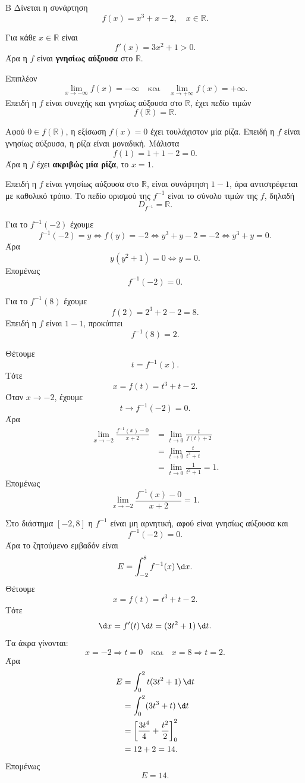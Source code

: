 \begin{thema}{Β}
Δίνεται η συνάρτηση
\[
f(x)=x^3+x-2,\quad x\in\mathbb{R}.
\]
\begin{erwthma}
\item Για κάθε $x\in\mathbb{R}$ είναι
\[
f'(x)=3x^2+1>0.
\]
Άρα η $f$ είναι \textbf{γνησίως αύξουσα} στο $\mathbb{R}$.

Επιπλέον
\[
\lim_{x\to-\infty}f(x)=-\infty
\quad\text{και}\quad
\lim_{x\to+\infty}f(x)=+\infty.
\]
Επειδή η $f$ είναι συνεχής και γνησίως αύξουσα στο $\mathbb{R}$, έχει πεδίο τιμών
\[
{f(\mathbb{R})=\mathbb{R}}.
\]

Αφού $0\in f(\mathbb{R})$, η εξίσωση $f(x)=0$ έχει τουλάχιστον μία ρίζα. Επειδή η $f$ είναι γνησίως αύξουσα, η ρίζα είναι μοναδική. Μάλιστα
\[
f(1)=1+1-2=0.
\]
Άρα η $f$ έχει \textbf{ακριβώς μία ρίζα}, το $x=1$.

\item Επειδή η $f$ είναι γνησίως αύξουσα στο $\mathbb{R}$, είναι συνάρτηση $1-1$, άρα αντιστρέφεται με καθολικό τρόπο. Το πεδίο ορισμού της $f^{-1}$ είναι το σύνολο τιμών της $f$, δηλαδή
\[
D_{f^{-1}}=\mathbb{R}.
\]

Για το $f^{-1}(-2)$ έχουμε
\[
f^{-1}(-2)=y
\Leftrightarrow f(y)=-2
\Leftrightarrow y^3+y-2=-2
\Leftrightarrow y^3+y=0.
\]
Άρα
\[
y(y^2+1)=0
\Leftrightarrow y=0.
\]
Επομένως
\[
{f^{-1}(-2)=0}.
\]

Για το $f^{-1}(8)$ έχουμε
\[
f(2)=2^3+2-2=8.
\]
Επειδή η $f$ είναι $1-1$, προκύπτει
\[
{f^{-1}(8)=2}.
\]

\item Θέτουμε
\[
t=f^{-1}(x).
\]
Τότε
\[
x=f(t)=t^3+t-2.
\]
Όταν $x\to-2$, έχουμε
\[
t\to f^{-1}(-2)=0.
\]
Άρα
\begin{align*}
\lim_{x\to-2}\frac{f^{-1}(x)-0}{x+2}
&=\lim_{t\to0}\frac{t}{f(t)+2}\\
&=\lim_{t\to0}\frac{t}{t^3+t}\\
&=\lim_{t\to0}\frac{1}{t^2+1}=1.
\end{align*}
Επομένως
\[
{\lim_{x\to-2}\frac{f^{-1}(x)-0}{x+2}=1}.
\]

\item Στο διάστημα $[-2,8]$ η $f^{-1}$ είναι μη αρνητική, αφού είναι γνησίως αύξουσα και
\[
f^{-1}(-2)=0.
\]
Άρα το ζητούμενο εμβαδόν είναι
\[
E=\dint_{-2}^{8} f^{-1}(x)\,\d x.
\]
Θέτουμε
\[
x=f(t)=t^3+t-2.
\]
Τότε
\[
\d x=f'(t)\,\d t=(3t^2+1)\,\d t.
\]
Τα άκρα γίνονται:
\[
x=-2\Rightarrow t=0
\quad\text{και}\quad
x=8\Rightarrow t=2.
\]
Άρα
\begin{align*}
E&=\dint_0^2 t(3t^2+1)\,\d t\\
&=\dint_0^2 (3t^3+t)\,\d t\\
&=\left[\frac{3t^4}{4}+\frac{t^2}{2}\right]_0^2\\
&=12+2=14.
\end{align*}
Επομένως
\[
{E=14}.
\]
\end{erwthma}
\end{thema}

